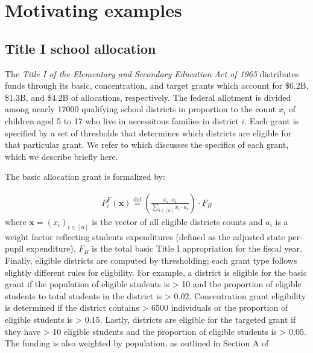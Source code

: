 \documentclass[9pt,twocolumn,twoside,lineno]{pnas-new}
\begin{document}
  

\section*{Motivating examples}
\subsection{Title I school allocation}
The \emph{Title I of the Elementary and Secondary Education Act of
  1965} \cite{Sonnenberg:16} distributes funds through its basic, concentration, and target grants which account for \$6.2B, \$1.3B, and \$4.2B of allocations, respectively. The federal allotment is divided among nearly 17000 qualifying school
districts in proportion to the count $x_i$ of children aged 5 to 17
who live in necessitous families in district $i$. Each grant is specified by a set of thresholds that determines which districts are eligible for that particular grant. We refer to \cite{Sonnenberg:16} which discusses the specifics of each grant, which we describe briefly here.

The basic allocation grant is formalized by:
\newcommand{\tfa}{P^F}
\newcommand{\rev}[1]{{\color{purple}{#1}}}
\newcommand{\add}[1]{{\color{darkgreen}{#1}}}
\newcommand*{\defeq}{\stackrel{\text{def}}{=}}
\def\aux{\mathrm{aux}}

\begin{align}
\label{eq:allotment}%
  \tfa_i(\bm{x}) \defeq \left( 
  \frac{x_i \cdot a_i}{\sum_{i \in [n] }x_i \cdot a_i}\right) \cdot F_{B}
\end{align}
where $\bm{x} = (x_i)_{i\in[n]}$ is the vector of all eligible districts counts 
and $a_i$ is a weight factor reflecting students expenditures (defined as the adjusted state per-pupil expenditure). $F_{B}$ is the total basic Title I appropriation for the fiscal year. Finally, eligible districts are computed by thresholding; each grant type follows slightly different rules for eligbility. For example, a district is eligible for the basic grant if the population of eligible students is > 10 and the proportion of eligible students to total students in the district is > 0.02. Concentration grant eligibility is determined if the district contains > 6500 individuals or the proportion of eligible students is > 0.15. Lastly, districts are eligible for the targeted grant if they have > 10 eligible students and the proportion of eligible students is > 0.05. The funding is also weighted by population, as outlined in Section A of \cite{Sonnenberg:16}
\end{document}
